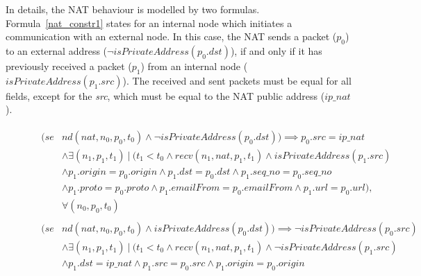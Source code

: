In details, the NAT behaviour is modelled by two formulas. Formula~\ref{nat_constr1} states for an internal node which initiates a communication with an external node. In this case, the NAT sends a packet (\textit{$p_0$}) to an external address (\textit{$\neg isPrivateAddress(p_{0}.dst)$}), if and only if it has previously received a packet (\textit{$p_1$}) from an internal node (\textit{$isPrivateAddress(p_{1}.src)$}). The received and sent packets must be equal for all fields, except for the \textit{src}, which must be equal to the NAT public address (\textit{$ip\_nat$}).\\
\begin{figure}[h]
	{\footnotesize
		\begin{subequations}
			\begin{align}
			\begin{split}
			\label{nat_constr1}
			(se& nd(nat, n_{0}, p_{0}, t_{0}) \wedge \neg isPrivateAddress(p_{0}.dst)) \implies p_{0}.src = ip\_nat \\
			& \wedge \exists (n_{1}, p_{1}, t_{1}) \: | \: (t_{1} < t_{0} \wedge recv(n_{1}, nat, p_{1}, t_{1}) \wedge isPrivateAddress(p_{1}.src) \\
			& \wedge p_{1}.origin = p_{0}.origin \wedge p_{1}.dst = p_{0}.dst \wedge p_{1}.seq\_no = p_{0}.seq\_no \\
			& \wedge p_{1}.proto = p_{0}.proto \wedge p_{1}.emailFrom = p_{0}.emailFrom \wedge p_{1}.url = p_{0}.url), \\
			& \forall (n_{0}, p_{0}, t_{0})
			\end{split} \\
			\begin{split}
			\label{nat_constr2}
			(se& nd(nat, n_{0}, p_{0}, t_{0}) \wedge isPrivateAddress(p_{0}.dst)) \implies \neg isPrivateAddress(p_{0}.src) \\
			& \wedge \exists  (n_{1}, p_{1}, t_{1}) \: | \: (t_{1} < t_{0} \wedge recv(n_{1}, nat, p_{1}, t_{1}) \wedge \neg isPrivateAddress(p_{1}.src) \\
			& \wedge p_{1}.dst = ip\_nat \wedge p_{1}.src = p_{0}.src \wedge p_{1}.origin = p_{0}.origin \\

\end{split}
\end{align}
\end{subequations}}
\end{figure}
